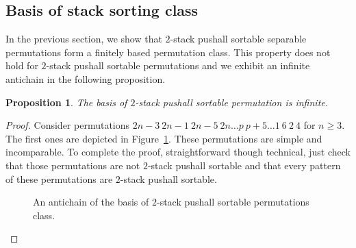 \documentclass[11pt]{article}
\newtheorem{prop}[thm]{Proposition}
\newcommand{\pushall}{$2$-stack pushall sortable\xspace}
\newcounter{indice}
\newcommand{\permutation}[1]{
\setcounter{indice}{0};
\foreach \i in {#1} 
\addtocounter{indice}{1};

\addtocounter{indice}{1}
\draw [help lines] (1,1) grid (\theindice,\theindice);

\setcounter{indice}{1};

\foreach \i in { #1 } {
\draw (\theindice+.5,\i+.5) [fill] circle (.2);
\addtocounter{indice}{1};
}
\addtocounter{indice}{-1};
}
\begin{document}
\subsection{Basis of stack sorting class}
In the previous section, we show that \pushall separable permutations form a finitely based permutation class. 
This property does not hold for \pushall permutations and we exhibit an infinite antichain in the following proposition.

\begin{prop}
The basis of \pushall permutation is infinite.
\end{prop}

\begin{proof}
Consider permutations $2n-3\ 2n-1\ 2n-5\ 2n \dots p\ p+5 \dots 1\ 6\ 2\ 4$ for $n \geq 3$.
The first ones are depicted in Figure~\ref{fig:antichaine}. These permutations are simple and incomparable.
To complete the proof, straightforward though technical, just check that those permutations are not \pushall and that every pattern 
of these permutations are \pushall.

\begin{figure}[ht]
\begin{center}
\caption{An antichain of the basis of \pushall permutations class.}
\label{fig:antichaine}
\end{center}
\end{figure}

\end{proof}
\end{document}
